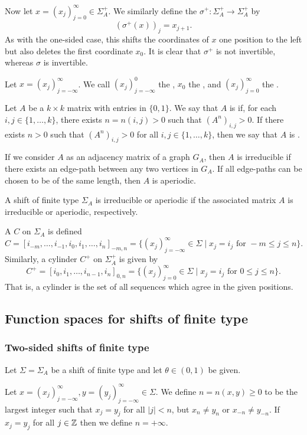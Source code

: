 Now let $x = (x_j)_{j = 0}^\infty \in \Sigma_A^+$. We similarly define the  $\sigma^+ : \Sigma_A^+ \to \Sigma_A^+$ by
\[
	(\sigma^+(x))_j = x_{j + 1}.
\]
As with the one-sided case, this shifts the coordinates of $x$ one position to the left but also deletes the first coordinate $x_0$. It is clear that $\sigma^+$ is not invertible, whereas $\sigma$ is invertible.

Let $x = (x_j)_{j = -\infty}^\infty$. We call $(x_j)_{j = -\infty}^0$ the , $x_0$ the , and $(x_j)_{j = 0}^\infty$ the .

Let $A$ be a $k \times k$ matrix with entries in $\{0, 1\}$. We say that $A$ is  if, for each $i, j \in \{1, \dots, k\}$, there exists $n = n(i, j) > 0$ such that $(A^n)_{i, j} > 0$. If there exists $n > 0$ such that $(A^n)_{i, j} > 0$ for all $i, j \in \{1, \dots, k\}$, then we say that $A$ is .

If we consider $A$ as an adjacency matrix of a graph $G_A$, then $A$ is irreducible if there exists an edge-path between any two vertices in $G_A$. If all edge-paths can be chosen to be of the same length, then $A$ is aperiodic.

A shift of finite type $\Sigma_A$ is irreducible or aperiodic if the associated matrix $A$ is irreducible or aperiodic, respectively.

A  $C$ on $\Sigma_A$ is defined
\[
	C = [i_{-m}, \dots, i_{-1}, i_0, i_1, \dots, i_n]_{-m, n} = \{(x_j)_{j = -\infty}^\infty \in \Sigma \mid x_j = i_j \text{ for } -m \leq j \leq n\}.
\]
Similarly, a cylinder $C^+$ on $\Sigma_A^+$ is given by
\[
	C^+ = [i_0, i_1, \dots, i_{n - 1}, i_n]_{0, n} = \{(x_j)_{j = 0}^\infty \in \Sigma \mid x_j = i_j \text{ for } 0 \leq j \leq n\}.
\]
That is, a cylinder is the set of all sequences which agree in the given positions.

\subsection{Function spaces for shifts of finite type}
\subsubsection{Two-sided shifts of finite type}
Let $\Sigma = \Sigma_A$ be a shift of finite type and let $\theta \in (0, 1)$ be given.

Let $x = (x_j)_{j = -\infty}^\infty, y = (y_j)_{j = -\infty}^\infty \in \Sigma$. We define $n = n(x, y) \geq 0$ to be the largest integer such that $x_j = y_j$ for all $|j| < n$, but $x_n \neq y_n$ or $x_{-n} \neq y_{-n}$. If $x_j = y_j$ for all $j \in \mathbb{Z}$ then we define $n = +\infty$.

